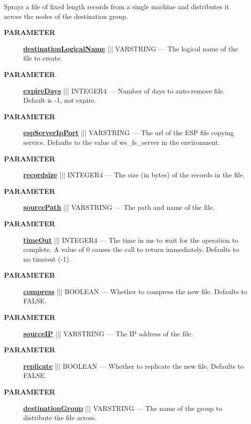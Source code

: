 \par





Sprays a file of fixed length records from a single machine and distributes it across the nodes of the destination group.






\par
\begin{description}
\item [\colorbox{tagtype}{\color{white} \textbf{\textsf{PARAMETER}}}] \textbf{\underline{destinationLogicalName}} ||| VARSTRING --- The logical name of the file to create.
\item [\colorbox{tagtype}{\color{white} \textbf{\textsf{PARAMETER}}}] \textbf{\underline{expireDays}} ||| INTEGER4 --- Number of days to auto-remove file. Default is -1, not expire.
\item [\colorbox{tagtype}{\color{white} \textbf{\textsf{PARAMETER}}}] \textbf{\underline{espServerIpPort}} ||| VARSTRING --- The url of the ESP file copying service. Defaults to the value of ws\_fs\_server in the environment.
\item [\colorbox{tagtype}{\color{white} \textbf{\textsf{PARAMETER}}}] \textbf{\underline{recordsize}} ||| INTEGER4 --- The size (in bytes) of the records in the file.
\item [\colorbox{tagtype}{\color{white} \textbf{\textsf{PARAMETER}}}] \textbf{\underline{sourcePath}} ||| VARSTRING --- The path and name of the file.
\item [\colorbox{tagtype}{\color{white} \textbf{\textsf{PARAMETER}}}] \textbf{\underline{timeOut}} ||| INTEGER4 --- The time in ms to wait for the operation to complete. A value of 0 causes the call to return immediately. Defaults to no timeout (-1).
\item [\colorbox{tagtype}{\color{white} \textbf{\textsf{PARAMETER}}}] \textbf{\underline{compress}} ||| BOOLEAN --- Whether to compress the new file. Defaults to FALSE.
\item [\colorbox{tagtype}{\color{white} \textbf{\textsf{PARAMETER}}}] \textbf{\underline{sourceIP}} ||| VARSTRING --- The IP address of the file.
\item [\colorbox{tagtype}{\color{white} \textbf{\textsf{PARAMETER}}}] \textbf{\underline{replicate}} ||| BOOLEAN --- Whether to replicate the new file. Defaults to FALSE.
\item [\colorbox{tagtype}{\color{white} \textbf{\textsf{PARAMETER}}}] \textbf{\underline{destinationGroup}} ||| VARSTRING --- The name of the group to distribute the file across.

\end{description}
